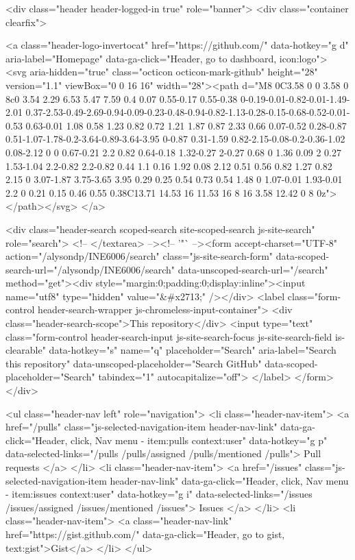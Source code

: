     



        <div class="header header-logged-in true" role="banner">
  <div class="container clearfix">

    <a class="header-logo-invertocat" href="https://github.com/" data-hotkey="g d" aria-label="Homepage" data-ga-click="Header, go to dashboard, icon:logo">
  <svg aria-hidden="true" class="octicon octicon-mark-github" height="28" version="1.1" viewBox="0 0 16 16" width="28"><path d="M8 0C3.58 0 0 3.58 0 8c0 3.54 2.29 6.53 5.47 7.59 0.4 0.07 0.55-0.17 0.55-0.38 0-0.19-0.01-0.82-0.01-1.49-2.01 0.37-2.53-0.49-2.69-0.94-0.09-0.23-0.48-0.94-0.82-1.13-0.28-0.15-0.68-0.52-0.01-0.53 0.63-0.01 1.08 0.58 1.23 0.82 0.72 1.21 1.87 0.87 2.33 0.66 0.07-0.52 0.28-0.87 0.51-1.07-1.78-0.2-3.64-0.89-3.64-3.95 0-0.87 0.31-1.59 0.82-2.15-0.08-0.2-0.36-1.02 0.08-2.12 0 0 0.67-0.21 2.2 0.82 0.64-0.18 1.32-0.27 2-0.27 0.68 0 1.36 0.09 2 0.27 1.53-1.04 2.2-0.82 2.2-0.82 0.44 1.1 0.16 1.92 0.08 2.12 0.51 0.56 0.82 1.27 0.82 2.15 0 3.07-1.87 3.75-3.65 3.95 0.29 0.25 0.54 0.73 0.54 1.48 0 1.07-0.01 1.93-0.01 2.2 0 0.21 0.15 0.46 0.55 0.38C13.71 14.53 16 11.53 16 8 16 3.58 12.42 0 8 0z"></path></svg>
</a>


        <div class="header-search scoped-search site-scoped-search js-site-search" role="search">
  <!-- </textarea> --><!-- '"` --><form accept-charset="UTF-8" action="/alysondp/INE6006/search" class="js-site-search-form" data-scoped-search-url="/alysondp/INE6006/search" data-unscoped-search-url="/search" method="get"><div style="margin:0;padding:0;display:inline"><input name="utf8" type="hidden" value="&#x2713;" /></div>
    <label class="form-control header-search-wrapper js-chromeless-input-container">
      <div class="header-search-scope">This repository</div>
      <input type="text"
        class="form-control header-search-input js-site-search-focus js-site-search-field is-clearable"
        data-hotkey="s"
        name="q"
        placeholder="Search"
        aria-label="Search this repository"
        data-unscoped-placeholder="Search GitHub"
        data-scoped-placeholder="Search"
        tabindex="1"
        autocapitalize="off">
    </label>
</form></div>


      <ul class="header-nav left" role="navigation">
        <li class="header-nav-item">
          <a href="/pulls" class="js-selected-navigation-item header-nav-link" data-ga-click="Header, click, Nav menu - item:pulls context:user" data-hotkey="g p" data-selected-links="/pulls /pulls/assigned /pulls/mentioned /pulls">
            Pull requests
</a>        </li>
        <li class="header-nav-item">
          <a href="/issues" class="js-selected-navigation-item header-nav-link" data-ga-click="Header, click, Nav menu - item:issues context:user" data-hotkey="g i" data-selected-links="/issues /issues/assigned /issues/mentioned /issues">
            Issues
</a>        </li>
          <li class="header-nav-item">
            <a class="header-nav-link" href="https://gist.github.com/" data-ga-click="Header, go to gist, text:gist">Gist</a>
          </li>
      </ul>

